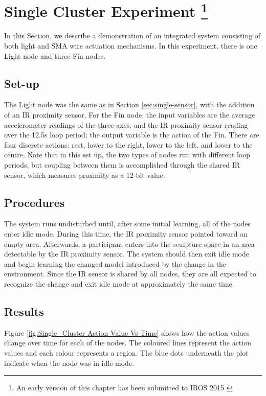 \section[Single Cluster Experiment]
{Single Cluster Experiment
	\footnote{An early version of this chapter has been submitted to IROS 2015 \cite{Chan2015} }} \label{sec:single-cluster}


In this Section, we describe a demonstration of an integrated system consisting of both light and SMA wire actuation mechanisms. In this experiment, there is one Light node and three Fin nodes. 

\subsection{Set-up} %
The Light node was the same as in Section \ref{sec:single-sensor}, with the addition of an IR proximity sensor. For the Fin node, the input variables are the average accelerometer readings of the three axes, and the IR proximity sensor reading over the 12.5s loop period; the output variable is the action of the Fin. There are four discrete actions: rest, lower to the right, lower to the left, and lower to the centre. Note that in this set up, the two types of nodes run with different loop periods, but coupling between them is accomplished through the shared IR sensor, which measures proximity as a 12-bit value.

\subsection{Procedures}
The system runs undisturbed until, after some initial learning, all of the nodes enter idle mode.  During this time, the IR proximity sensor pointed toward an empty area. Afterwards, a participant enters into the sculpture space in an area detectable by the IR proximity sensor. The system should then exit idle mode and begin learning the changed model introduced by the change in the environment.  Since the IR sensor is shared by all nodes, they are all expected to recognize the change and exit idle mode at approximately the same time. 

\subsection{Results}

Figure \ref{fig:Single_Cluster Action Value Vs Time} shows how the action values change over time for each of the nodes. The coloured lines represent the action values and each colour represents a region. The blue dots underneath the plot indicate when the node was in idle mode.

